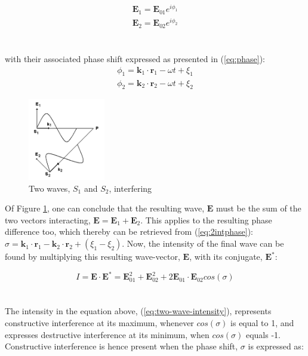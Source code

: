 \begin{equation}
    \begin{split}
    \textbf{E}_1 = \textbf{E}_{01} e^{i \phi_1}\\ %
    \textbf{E}_2 = \textbf{E}_{02} e^{i \phi_2}
    \end{split}
    \label{eq:2int}
\end{equation}
\\\\
with their associated phase shift expressed as presented in (\ref{eq:phase}):
\begin{equation}
    \begin{split}
    \phi_1 = \textbf{k}_1\cdot \textbf{r}_1 - \omega t + \xi_1\\
    \phi_2 = \textbf{k}_2\cdot \textbf{r}_2 - \omega t + \xi_2
    \end{split}
    \label{eq:2intphase}
\end{equation}
\begin{figure}[h]
  \centering
    \includegraphics[width=0.3\textwidth]{Images/theory/interference.png}
    \caption[Two Waves Interfering]{Two waves, $S_1$ and $S_2$, interfering}
    \label{fig:interference}
\end{figure}
Of Figure \ref{fig:interference}, one can conclude that the resulting wave, $\textbf{E}$ must be the sum of the two vectors interacting, $\textbf{E} = \textbf{E}_1 + \textbf{E}_2$. This applies to the resulting phase difference too, which thereby can be retrieved from (\ref{eq:2intphase}): $\sigma = \textbf{k}_1\cdot \textbf{r}_1 - \textbf{k}_2\cdot \textbf{r}_2 + (\xi_1 - \xi_2)$. Now, the intensity of the final wave can be found by multiplying this resulting wave-vector, $\textbf{E}$, with its conjugate, $\textbf{E}^*$: 

\begin{equation}
    I = \textbf{E} \cdot \textbf{E}^* = \textbf{E}_{01}^2 + \textbf{E}_{02}^2 + 2\textbf{E}_{01}\cdot \textbf{E}_{02} cos(\sigma)
    \label{eq:two-wave-intensity}
\end{equation}
\\\\
The intensity in the equation above, (\ref{eq:two-wave-intensity}), represents constructive interference at its maximum, whenever $cos(\sigma)$ is equal to 1, and expresses destructive interference at its minimum, when $cos(\sigma)$ equals -1. Constructive interference is hence present when the phase shift, $\sigma$ is expressed as:

